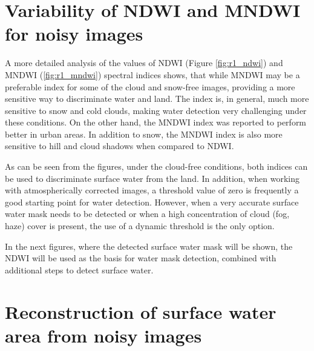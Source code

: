 \section{Variability of NDWI and MNDWI for noisy images}

A more detailed analysis of the values of NDWI (Figure \ref{fig:r1_ndwi}) and MNDWI (\ref{fig:r1_mndwi}) spectral indices shows, that while MNDWI may be a preferable index for some of the cloud and snow-free images, providing a more sensitive way to discriminate water and land. The index is, in general, much more sensitive to snow and cold clouds, making water detection very challenging under these conditions. On the other hand, the MNDWI index was reported to perform better in urban areas. In addition to snow, the MNDWI index is also more sensitive to hill and cloud shadows when compared to NDWI. 


As can be seen from the figures, under the cloud-free conditions, both indices can be used to discriminate surface water from the land. In addition, when working with atmospherically corrected images, a threshold value of zero is frequently a good starting point for water detection. However, when a very accurate surface water mask needs to be detected or when a high concentration of cloud (fog, haze) cover is present, the use of a dynamic threshold is the only option.

In the next figures, where the detected surface water mask will be shown, the NDWI will be used as the basis for water mask detection, combined with additional steps to detect surface water. 

\section{Reconstruction of surface water area from noisy images}

